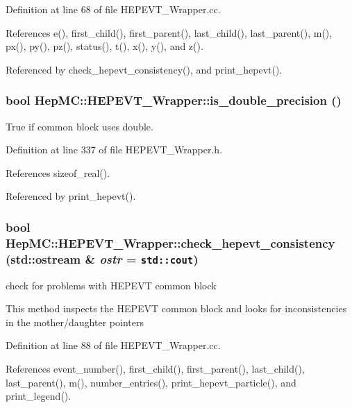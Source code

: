Definition at line 68 of file HEPEVT\_\-Wrapper.cc.

References e(), first\_\-child(), first\_\-parent(), last\_\-child(), last\_\-parent(), m(), px(), py(), pz(), status(), t(), x(), y(), and z().

Referenced by check\_\-hepevt\_\-consistency(), and print\_\-hepevt().
\subsubsection{\setlength{\rightskip}{0pt plus 5cm}bool Hep\-MC::HEPEVT\_\-Wrapper::is\_\-double\_\-precision ()\hspace{0.3cm}{\tt  [inline, static]}}\label{classHepMC_1_1HEPEVT__Wrapper_2a57cb9a0162c6c2791b6ce9454b12c6}


True if common block uses double. 



Definition at line 337 of file HEPEVT\_\-Wrapper.h.

References sizeof\_\-real().

Referenced by print\_\-hepevt().
\subsubsection{\setlength{\rightskip}{0pt plus 5cm}bool Hep\-MC::HEPEVT\_\-Wrapper::check\_\-hepevt\_\-consistency (std::ostream \& {\em ostr} = {\tt std::cout})\hspace{0.3cm}{\tt  [static]}}\label{classHepMC_1_1HEPEVT__Wrapper_b9425bd4b1ba5dbcc21b3716c74350a4}


check for problems with HEPEVT common block 



This method inspects the HEPEVT common block and looks for inconsistencies in the mother/daughter pointers 

Definition at line 88 of file HEPEVT\_\-Wrapper.cc.

References event\_\-number(), first\_\-child(), first\_\-parent(), last\_\-child(), last\_\-parent(), m(), number\_\-entries(), print\_\-hepevt\_\-particle(), and print\_\-legend().
